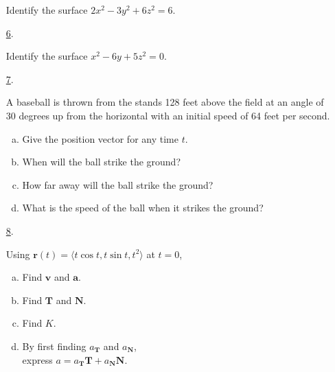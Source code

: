 \documentclass[fleqn]{article}
\renewcommand{\vec}[1]{\mathbf{#1}}
\begin{document}
\begin{itemize}
Identify the surface \(2x^2-3y^2+6z^2=6\).
\smallskip

\item[\hyperlink{6-answer}{6}.]\hypertarget{6-problem}{}

Identify the surface \(x^2-6y+5z^2=0\).
\smallskip

\item[\hyperlink{7-answer}{7}.]\hypertarget{7-problem}{}

A baseball is thrown from the stands 128 feet above the field at an angle of
30 degrees up from the horizontal with an initial speed of 64 feet per second.
\begin{enumerate}[a.]
  \item Give the position vector for any time \(t\).
  \item When will the ball strike the ground?
  \item How far away will the ball strike the ground?
  \item What is the speed of the ball when it strikes the ground?
\end{enumerate}
\smallskip

\item[\hyperlink{8-answer}{8}.]\hypertarget{8-problem}{}

Using \(\vec r(t)=\langle t\cos t,t\sin t,t^2\rangle\) at \(t=0\),
\begin{enumerate}[a.]
  \item Find \(\vec v\) and \(\vec a\).
  \item Find \(\vec T\) and \(\vec N\).
  \item Find \(K\).
  \item By first finding \(a_{\vec T}\) and \(a_{\vec N}\),\\
    express \(a=a_{\vec T}\vec T+a_{\vec N}\vec N\).
\end{enumerate}
\smallskip
\end{itemize}
\newpage
\end{document}
